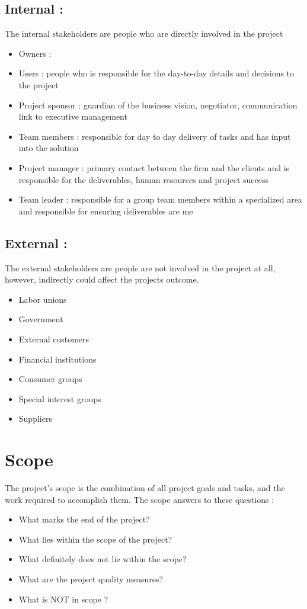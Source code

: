 \documentclass{article}
\begin{document}
\subsection{Internal :}
The internal stakeholders are people who are directly involved in the project
\begin{itemize}
	\item Owners : 
	\item Users : people who is responsible for the day-to-day details and decisions to the project
	\item Project sponsor : guardian of the business vision, negotiator, communication link to executive management
	\item Team members : responsible for day to day delivery of tasks and has input into the solution
	\item Project manager : primary contact between the firm and the clients and is responsible for the deliverables, human resources and project success
	\item Team leader : responsible for a group team members within a specialized area and responsible for ensuring deliverables are me
\end{itemize}

\subsection{External :}
The external stakeholders are people are not involved in the project at all, however, indirectly could affect the projects outcome.
\begin{itemize}
	\item Labor unions
	\item Government
	\item External customers
	\item Financial institutions
	\item Consumer groups
	\item Special interest groups
	\item Suppliers
\end{itemize}


\section{Scope}
The project's scope is the combination of all project goals and tasks, and the work required to accomplish them. The scope answers to these questions :
\begin{itemize}
	\item What marks the end of the project? 
	\item What lies within the scope of the project?
	\item What definitely does not lie within the scope?
	\item What are the project quality measures? 
	\item What is NOT in scope ?
\end{itemize}
\end{document}
